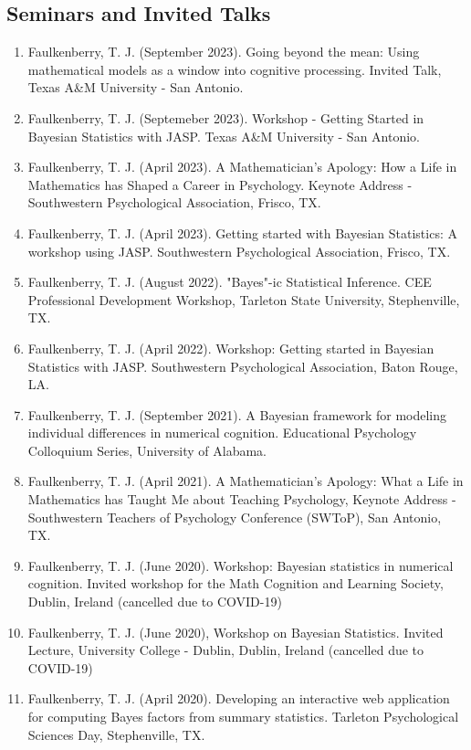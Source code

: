 \documentclass[article,10pt]{article}
\begin{document}
\subsection*{Seminars and Invited Talks}
\label{sec:org7613592}
\begin{enumerate}
\item Faulkenberry, T. J. (September 2023). Going beyond the mean: Using mathematical models as a window into cognitive processing. Invited Talk, Texas A\&M University - San Antonio.
\item Faulkenberry, T. J. (Septemeber 2023). Workshop - Getting Started in Bayesian Statistics with JASP. Texas A\&M University - San Antonio.
\item Faulkenberry, T. J. (April 2023). A Mathematician's Apology: How a Life in Mathematics has Shaped a Career in Psychology. Keynote Address - Southwestern Psychological Association, Frisco, TX.
\item Faulkenberry, T. J. (April 2023). Getting started with Bayesian Statistics: A workshop using JASP. Southwestern Psychological Association, Frisco, TX.
\item Faulkenberry, T. J. (August 2022). "Bayes"-ic Statistical Inference. CEE Professional Development Workshop, Tarleton State University, Stephenville, TX.
\item Faulkenberry, T. J. (April 2022). Workshop: Getting started in Bayesian Statistics with JASP. Southwestern Psychological Association, Baton Rouge, LA.
\item Faulkenberry, T. J. (September 2021). A Bayesian framework for modeling individual differences in numerical cognition. Educational Psychology Colloquium Series, University of Alabama.
\item Faulkenberry, T. J. (April 2021). A Mathematician's Apology: What a Life in Mathematics has Taught Me about Teaching Psychology,  Keynote Address - Southwestern Teachers of Psychology Conference (SWToP), San Antonio, TX.
\item Faulkenberry, T. J. (June 2020). Workshop: Bayesian statistics in numerical cognition. Invited workshop for the Math Cognition and Learning Society, Dublin, Ireland (cancelled due to COVID-19)
\item Faulkenberry, T. J. (June 2020), Workshop on Bayesian Statistics. Invited Lecture, University College - Dublin, Dublin, Ireland (cancelled due to COVID-19)
\item Faulkenberry, T. J. (April 2020). Developing an interactive web application for computing Bayes factors from summary statistics. Tarleton Psychological Sciences Day, Stephenville, TX.

\end{enumerate}
\end{document}
